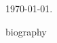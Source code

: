 \documentclass{minimal}
\begin{document}
\today.

\begin{minipage}{1sp}
\hskip1sp biography
\end{minipage}
\end{document}
